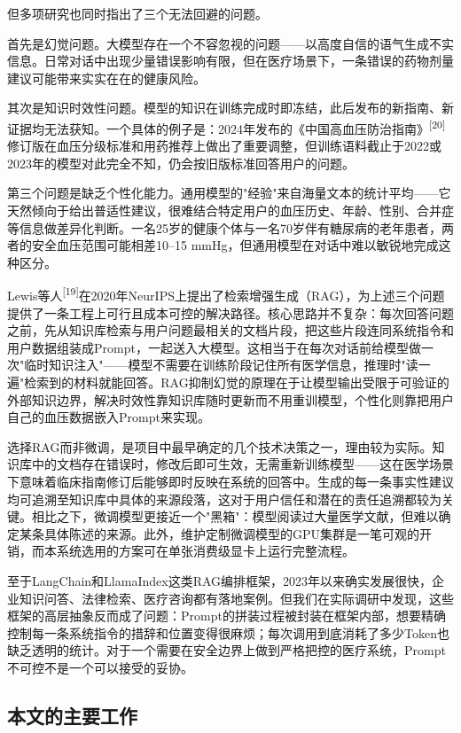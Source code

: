 \documentclass[zihao=-4,a4paper]{ctexart}
\begin{document}
但多项研究也同时指出了三个无法回避的问题。

首先是幻觉问题。大模型存在一个不容忽视的问题——以高度自信的语气生成不实信息。日常对话中出现少量错误影响有限，但在医疗场景下，一条错误的药物剂量建议可能带来实实在在的健康风险。

其次是知识时效性问题。模型的知识在训练完成时即冻结，此后发布的新指南、新证据均无法获知。一个具体的例子是：2024年发布的《中国高血压防治指南》\textsuperscript{[20]}修订版在血压分级标准和用药推荐上做出了重要调整，但训练语料截止于2022或2023年的模型对此完全不知，仍会按旧版标准回答用户的问题。

第三个问题是缺乏个性化能力。通用模型的"经验"来自海量文本的统计平均——它天然倾向于给出普适性建议，很难结合特定用户的血压历史、年龄、性别、合并症等信息做差异化判断。一名25岁的健康个体与一名70岁伴有糖尿病的老年患者，两者的安全血压范围可能相差10--15 mmHg，但通用模型在对话中难以敏锐地完成这种区分。

Lewis等人\textsuperscript{[19]}在2020年NeurIPS上提出了检索增强生成（RAG），为上述三个问题提供了一条工程上可行且成本可控的解决路径。核心思路并不复杂：每次回答问题之前，先从知识库检索与用户问题最相关的文档片段，把这些片段连同系统指令和用户数据组装成Prompt，一起送入大模型。这相当于在每次对话前给模型做一次"临时知识注入"——模型不需要在训练阶段记住所有医学信息，推理时"读一遍"检索到的材料就能回答。RAG抑制幻觉的原理在于让模型输出受限于可验证的外部知识边界，解决时效性靠知识库随时更新而不用重训模型，个性化则靠把用户自己的血压数据嵌入Prompt来实现。

选择RAG而非微调，是项目中最早确定的几个技术决策之一，理由较为实际。知识库中的文档存在错误时，修改后即可生效，无需重新训练模型——这在医学场景下意味着临床指南修订后能够即时反映在系统的回答中。生成的每一条事实性建议均可追溯至知识库中具体的来源段落，这对于用户信任和潜在的责任追溯都较为关键。相比之下，微调模型更接近一个"黑箱"：模型阅读过大量医学文献，但难以确定某条具体陈述的来源。此外，维护定制微调模型的GPU集群是一笔可观的开销，而本系统选用的方案可在单张消费级显卡上运行完整流程。

至于LangChain和LlamaIndex这类RAG编排框架，2023年以来确实发展很快，企业知识问答、法律检索、医疗咨询都有落地案例。但我们在实际调研中发现，这些框架的高层抽象反而成了问题：Prompt的拼装过程被封装在框架内部，想要精确控制每一条系统指令的措辞和位置变得很麻烦；每次调用到底消耗了多少Token也缺乏透明的统计。对于一个需要在安全边界上做到严格把控的医疗系统，Prompt不可控不是一个可以接受的妥协。

\subsection{本文的主要工作}
\end{document}
